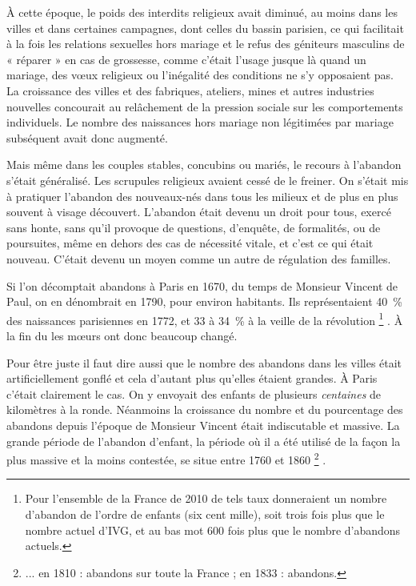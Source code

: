  




 À cette époque, le poids des interdits religieux avait diminué, au moins dans les villes et dans certaines campagnes, dont celles du bassin parisien, ce qui facilitait à la fois les relations sexuelles hors mariage et le refus des géniteurs masculins de « réparer » en cas de grossesse, comme c'était l'usage jusque là quand un mariage, des vœux religieux ou l'inégalité des conditions ne s'y opposaient pas. La croissance des villes et des fabriques, ateliers, mines et autres industries nouvelles concourait au relâchement de la pression sociale sur les comportements individuels. Le nombre des naissances hors mariage non légitimées par mariage subséquent avait donc augmenté. 

 Mais même dans les couples stables, concubins ou mariés, le recours à l'abandon s'était généralisé. Les scrupules religieux avaient cessé de le freiner. On s'était mis à pratiquer l'abandon des nouveaux-nés dans tous les milieux et de plus en plus souvent à visage découvert. L'abandon était devenu un droit pour tous, exercé sans honte, sans qu'il provoque de questions, d'enquête, de formalités, ou de poursuites, même en dehors des cas de nécessité vitale, et c'est ce qui était nouveau. C'était devenu un moyen comme un autre de régulation des familles. 
 
  Si l'on décomptait  abandons à Paris en 1670, du temps de Monsieur Vincent de Paul, on en dénombrait  en 1790, pour environ  habitants. Ils représentaient 40~\% des naissances parisiennes en 1772, et 33 à 34~\% à la veille de la révolution%
\footnote{Pour l'ensemble de la France de 2010 de tels taux donneraient un nombre d'abandon de l'ordre de  enfants (six cent mille), soit trois fois plus que le nombre actuel d'IVG, et au bas mot 600 fois plus que le nombre d'abandons actuels.}%
. À la fin du  les mœurs ont donc beaucoup changé.

 Pour être juste il faut dire aussi que le nombre des abandons dans les villes était artificiellement gonflé et cela d'autant plus qu'elles étaient grandes. À Paris c'était clairement le cas. On y envoyait des enfants de plusieurs \emph{centaines} de kilomètres à la ronde. Néanmoins la croissance du nombre et du pourcentage des abandons depuis l'époque de Monsieur Vincent était indiscutable et massive. La grande période de l'abandon d'enfant, la période où il a été utilisé de la façon la plus massive et la moins contestée, se situe entre 1760 et 1860%
\footnote{... en 1810 :  abandons sur toute la France ; en 1833 :  abandons.}%
.

